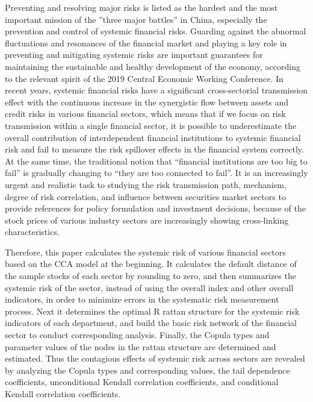 \begin{eabstract}
  Preventing and resolving major risks is listed as the hardest and the most important mission of 
  the ”three major battles” in China, especially the prevention and control of systemic financial 
  risks. Guarding against the abnormal fluctuations and resonances of the financial market and 
  playing a key role in preventing and mitigating systemic risks are important guarantees for 
  maintaining the sustainable and healthy development of the economy, according to the relevant 
  spirit of the 2019 Central Economic Working Conference. In recent years, systemic financial 
  risks have a significant cross-sectorial transmission effect with the continuous increase in 
  the synergistic flow between assets and credit risks in various financial sectors, which means 
  that if we focus on risk transmission within a single financial sector, it is possible to 
  underestimate the overall contribution of interdependent financial institutions to systemic 
  financial risk and fail to measure the risk spillover effects in the financial system correctly. 
  At the same time, the traditional notion that “financial institutions are too big to fail” 
  is gradually changing to “they are too connected to fail”. It is an increasingly urgent and 
  realistic task to studying the risk transmission path, mechanism, degree of risk correlation, 
  and influence between securities market sectors to provide references for policy formulation 
  and investment decisions, because of the stock prices of various industry sectors are 
  increasingly showing cross-linking characteristics.
  
Therefore, this paper calculates the systemic risk of various financial sectors based on the CCA 
model at the beginning. It calculates the default distance of the sample stocks of each sector 
by rounding to zero, and then summarizes the systemic risk of the sector, instead of using the 
overall index and other overall indicators, in order to minimize errors in the systematic 
risk measurement process. Next it determines the optimal R rattan structure for the systemic 
risk indicators of each department, and build the basic risk network of the financial sector to 
conduct corresponding analysis. Finally, the Copula types and parameter values of the nodes in 
the rattan structure are determined and estimated. Thus the contagious effects of systemic risk 
across sectors are revealed by analyzing the Copula types and corresponding values, the tail 
dependence coefficients, unconditional Kendall correlation coefficients, and conditional Kendall correlation coefficients.


\end{eabstract}
